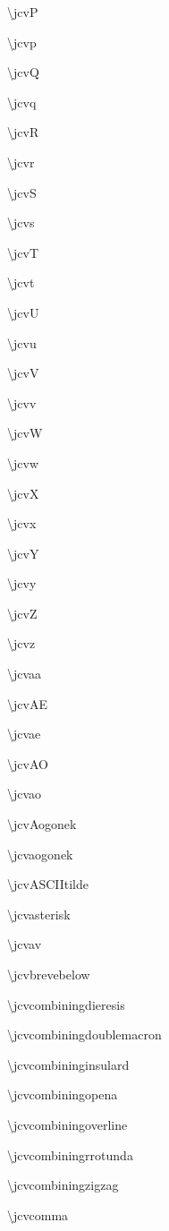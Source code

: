 \documentclass[12pt]{article}
\begin{document}
\begin{multicols}{3}
\textbackslash jcvP

\textbackslash jcvp

\textbackslash jcvQ

\textbackslash jcvq

\textbackslash jcvR

\textbackslash jcvr

\textbackslash jcvS

\textbackslash jcvs

\textbackslash jcvT

\textbackslash jcvt

\textbackslash jcvU

\textbackslash jcvu

\textbackslash jcvV

\textbackslash jcvv

\textbackslash jcvW

\textbackslash jcvw

\textbackslash jcvX

\textbackslash jcvx

\textbackslash jcvY

\textbackslash jcvy

\textbackslash jcvZ

\textbackslash jcvz

\textbackslash jcvaa

\textbackslash jcvAE

\textbackslash jcvae

\textbackslash jcvAO

\textbackslash jcvao

\textbackslash jcvAogonek

\textbackslash jcvaogonek

\textbackslash jcvASCIItilde

\textbackslash jcvasterisk

\textbackslash jcvav

\textbackslash jcvbrevebelow

\textbackslash jcvcombiningdieresis

\textbackslash jcvcombiningdoublemacron

\textbackslash jcvcombininginsulard

\textbackslash jcvcombiningopena

\textbackslash jcvcombiningoverline

\textbackslash jcvcombiningrrotunda

\textbackslash jcvcombiningzigzag

\textbackslash jcvcomma


\end{multicols}
\end{document}

